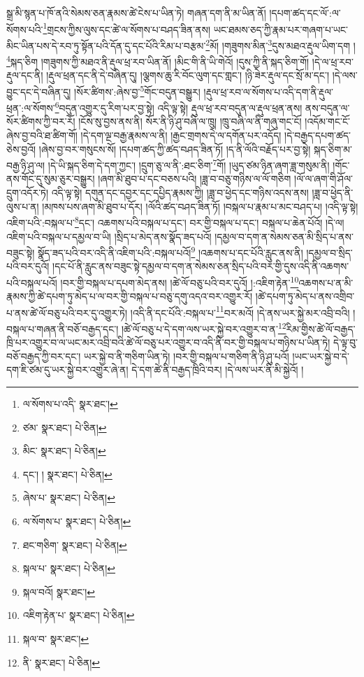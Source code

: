 སྒྲ་མི་སྙན་པ་ཁོ་ནའི་སེམས་ཅན་རྣམས་ཚེ་ངེས་པ་ཡིན་ཏེ། གཞན་དག་ནི་མ་ཡིན་ནོ། །དཔག་ཚད་དང་ལོ་:ལ་སོགས་པའི་\footnote{ལ་སོགས་པ་འདི་  སྣར་ཐང་། }གྲངས་ཀྱིས་ལུས་དང་ཚེ་ལ་སོགས་པ་བཤད་ཟིན་ནས། ཡང་ཐམས་ཅད་ཀྱི་རྣམ་པར་གཞག་པ་ཡང་མིང་ཡིན་པས་དེ་རབ་ཏུ་སྟོན་པའི་དོན་དུ་དང་པོའི་རིམ་པ་བརྩམ་\footnote{ཙམ་  སྣར་ཐང་།  པེ་ཅིན། }མོ། །གཟུགས་མིན་\footnote{མིང་  སྣར་ཐང་།  པེ་ཅིན། }དུས་མཐའ་རྡུལ་ཡིག་དག །\footnote{དང་། །  སྣར་ཐང་།  པེ་ཅིན། }སྐད་ཅིག །གཟུགས་ཀྱི་མཐའ་ནི་རྡུལ་ཕྲ་རབ་ཡིན་ནོ། །མིང་གི་ནི་ཡི་གེའོ། །དུས་ཀྱི་ནི་སྐད་ཅིག་གོ། །དེ་ལ་ཕྲ་རབ་རྡུལ་དང་ནི། །རྡུལ་ཕྲན་དང་ནི་དེ་བཞིན་དུ། །ལྕགས་ཆུ་རི་བོང་ལུག་དང་གླང་། །ཉི་ཟེར་རྡུལ་དང་སྲོ་མ་དང་། །དེ་ལས་བྱུང་དང་དེ་བཞིན་དུ། །སོར་ཚིགས་:ཞེས་བྱ་\footnote{ཞེས་པ་  སྣར་ཐང་།  པེ་ཅིན། }གོང་བདུན་བསྒྱུར། །རྡུལ་ཕྲ་རབ་ལ་སོགས་པ་འདི་དག་ནི་རྡུལ་ཕྲན་:ལ་སོགས་\footnote{ལ་སོགས་པ་  སྣར་ཐང་།  པེ་ཅིན། }བདུན་འགྱུར་དུ་རིག་པར་བྱ་སྟེ། འདི་ལྟ་སྟེ། རྡུལ་ཕྲ་རབ་བདུན་ལ་རྡུལ་ཕྲན་ནས། ནས་བདུན་ལ་སོར་ཚིགས་ཀྱི་བར་རོ། །ངོས་སུ་བྱས་ནས་ནི། སོར་ནི་ཉི་ཤུ་བཞི་ལ་ཁྲུ། །ཁྲུ་བཞི་ལ་ནི་གཞུ་གང་ངོ། །འདོམ་གང་ངོ་ཞེས་བྱ་བའི་ཐ་ཚིག་གོ། །དེ་དག་ལྔ་བརྒྱ་རྣམས་ལ་ནི། །རྒྱང་གྲགས་དེ་ལ་དགོན་པར་འདོད། །དེ་བརྒྱད་དཔག་ཚད་ཅེས་བྱའོ། །ཞེས་བྱ་བར་གསུངས་སོ། །དཔག་ཚད་ཀྱི་ཚད་བཤད་ཟིན་ཏོ། །ད་ནི་ལོའི་བརྗོད་པར་བྱ་སྟེ། སྐད་ཅིག་མ་བརྒྱ་ཉི་ཤུ་ལ། །དེ་ཡི་སྐད་ཅིག་དེ་དག་ཀྱང་། །དྲུག་ཅུ་ལ་ནི་:ཐང་ཅིག་\footnote{ཐང་གཅིག་  སྣར་ཐང་།  པེ་ཅིན། }གོ། །ཡུད་ཙམ་ཉིན་ཞག་ཟླ་གསུམ་ནི། །གོང་ནས་གོང་དུ་སུམ་ཅུར་བསྒྱུར། །ཞག་མི་ཐུབ་པ་དང་བཅས་པའི། །ཟླ་བ་བཅུ་གཉིས་ལ་ལོ་གཅིག །ལོ་ལ་ཞག་གི་ཤོལ་དྲུག་འདོར་ཏེ། འདི་ལྟ་སྟེ། དགུན་དང་དབྱར་དང་དཔྱིད་རྣམས་ཀྱི། །ཟླ་བ་ཕྱེད་དང་གཉིས་འདས་ནས། །ཟླ་བ་ཕྱེད་ནི་ལུས་པ་ན། །མཁས་པས་ཞག་མི་ཐུབ་པ་དོར། །ལོའི་ཚད་བཤད་ཟིན་ཏོ། །བསྐལ་པ་རྣམ་པ་མང་བཤད་པ། །འདི་ལྟ་སྟེ། འཇིག་པའི་:བསྐལ་པ་\footnote{སྐལ་པ་  སྣར་ཐང་།  པེ་ཅིན། }དང་། འཆགས་པའི་བསྐལ་པ་དང་། བར་གྱི་བསྐལ་པ་དང་། བསྐལ་པ་ཆེན་པོའོ། །དེ་ལ། འཇིག་པའི་བསྐལ་པ་དམྱལ་བ་ཡི། །སྲིད་པ་མེད་ནས་སྣོད་ཟད་པའོ། །དམྱལ་བ་དག་ན་སེམས་ཅན་མི་སྲིད་པ་ནས་བཟུང་སྟེ། སྣོད་ཟད་པའི་བར་འདི་ནི་འཇིག་པའི་:བསྐལ་པའོ།\footnote{སྐལ་བའོ།  སྣར་ཐང་། } །འཆགས་པ་དང་པོའི་རླུང་ནས་ནི། །དམྱལ་བ་སྲིད་པའི་བར་དུའོ། །དང་པོ་ནི་རླུང་ནས་བཟུང་སྟེ་དམྱལ་བ་དག་ན་སེམས་ཅན་སྲིད་པའི་བར་གྱི་དུས་འདི་ནི་འཆགས་པའི་བསྐལ་པའོ། །བར་གྱི་བསྐལ་པ་དཔག་མེད་ནས། །ཚེ་ལོ་བཅུ་པའི་བར་དུའོ། །:འཇིག་རྟེན་\footnote{འཇིག་རྟེན་པ་  སྣར་ཐང་།  པེ་ཅིན། }འཆགས་པ་ན་མི་རྣམས་ཀྱི་ཚེ་དཔག་ཏུ་མེད་པ་ལ་བར་གྱི་བསྐལ་པ་བཅུ་དགུ་འདའ་བར་འགྱུར་རོ། །ཚེ་དཔག་ཏུ་མེད་པ་ནས་འགྲིབ་པ་ནས་ཚེ་ལོ་བཅུ་པའི་བར་དུ་འགྱུར་ཏེ། །འདི་ནི་དང་པོའི་:བསྐལ་པ་\footnote{སྐལ་བ་  སྣར་ཐང་། }བར་མའོ། །དེ་ནས་ཡར་སྐྱེ་མར་འབྲི་བའི། །བསྐལ་པ་གཞན་ནི་བཅོ་བརྒྱད་དང་། །ཚེ་ལོ་བཅུ་པ་དེ་དག་ལས་ཡར་སྐྱེ་བར་འགྱུར་བ་ན་\footnote{ནི་  སྣར་ཐང་།  པེ་ཅིན། }རིམ་གྱིས་ཚེ་ལོ་བརྒྱད་ཁྲི་པར་འགྱུར་བ་ལ་ཡང་མར་འབྲི་བའི་ཚེ་ལོ་བཅུ་པར་འགྱུར་བ་འདི་ནི་བར་གྱི་བསྐལ་པ་གཉིས་པ་ཡིན་ཏེ། དེ་ལྟ་བུ་བཅོ་བརྒྱད་ཀྱི་བར་དང་། ཡར་སྐྱེ་བ་ནི་གཅིག་ཡིན་ཏེ། །བར་གྱི་བསྐལ་པ་གཅིག་ནི་ཉི་ཤུ་པའོ། །ཡང་ཡར་སྐྱེ་བ་དེ་དག་ཇི་ཙམ་དུ་ཡར་སྐྱེ་བར་འགྱུར་ཞེ་ན། དེ་དག་ཚེ་ནི་བརྒྱད་ཁྲིའི་བར། །དེ་ལས་ཡར་ནི་མི་སྐྱེའོ། །
